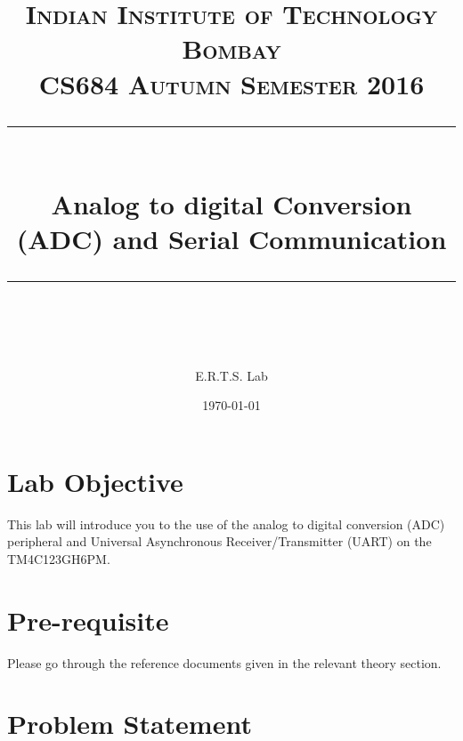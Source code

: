 \documentclass{article} %
\title{
\normalfont \normalsize 
\textsc{Indian Institute of Technology Bombay \\ 
CS684 Autumn Semester 2016} \\
[10pt] 
\rule{\linewidth}{0.5pt} \\[6pt] 
\huge Analog to digital Conversion (ADC) and Serial Communication \\
\rule{\linewidth}{2pt}  \\[10pt]
}
\author{E.R.T.S. Lab}
\date{\normalsize \today}
\begin{document}
\maketitle
\noindent

\section{Lab Objective}
This lab will introduce you to the use of the analog to digital conversion (ADC) peripheral and Universal Asynchronous Receiver/Transmitter (UART) on the TM4C123GH6PM.


\section{Pre-requisite}
Please go through the reference documents given in the relevant theory section.

\section{Problem Statement}
\end{document}
